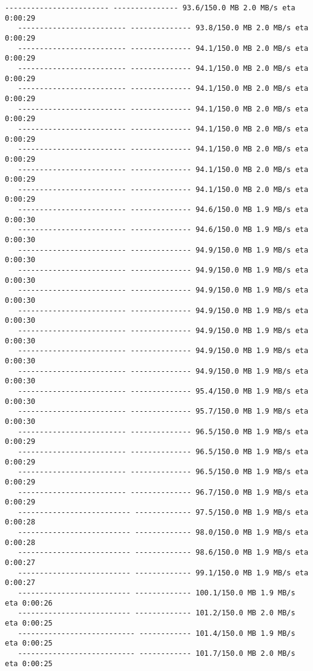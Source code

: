 \documentclass[11pt]{article}
\begin{document}
\begin{Verbatim}[commandchars=\\\{\}]
   ------------------------ --------------- 93.6/150.0 MB 2.0 MB/s eta 0:00:29
   ------------------------- -------------- 93.8/150.0 MB 2.0 MB/s eta 0:00:29
   ------------------------- -------------- 94.1/150.0 MB 2.0 MB/s eta 0:00:29
   ------------------------- -------------- 94.1/150.0 MB 2.0 MB/s eta 0:00:29
   ------------------------- -------------- 94.1/150.0 MB 2.0 MB/s eta 0:00:29
   ------------------------- -------------- 94.1/150.0 MB 2.0 MB/s eta 0:00:29
   ------------------------- -------------- 94.1/150.0 MB 2.0 MB/s eta 0:00:29
   ------------------------- -------------- 94.1/150.0 MB 2.0 MB/s eta 0:00:29
   ------------------------- -------------- 94.1/150.0 MB 2.0 MB/s eta 0:00:29
   ------------------------- -------------- 94.1/150.0 MB 2.0 MB/s eta 0:00:29
   ------------------------- -------------- 94.6/150.0 MB 1.9 MB/s eta 0:00:30
   ------------------------- -------------- 94.6/150.0 MB 1.9 MB/s eta 0:00:30
   ------------------------- -------------- 94.9/150.0 MB 1.9 MB/s eta 0:00:30
   ------------------------- -------------- 94.9/150.0 MB 1.9 MB/s eta 0:00:30
   ------------------------- -------------- 94.9/150.0 MB 1.9 MB/s eta 0:00:30
   ------------------------- -------------- 94.9/150.0 MB 1.9 MB/s eta 0:00:30
   ------------------------- -------------- 94.9/150.0 MB 1.9 MB/s eta 0:00:30
   ------------------------- -------------- 94.9/150.0 MB 1.9 MB/s eta 0:00:30
   ------------------------- -------------- 94.9/150.0 MB 1.9 MB/s eta 0:00:30
   ------------------------- -------------- 95.4/150.0 MB 1.9 MB/s eta 0:00:30
   ------------------------- -------------- 95.7/150.0 MB 1.9 MB/s eta 0:00:30
   ------------------------- -------------- 96.5/150.0 MB 1.9 MB/s eta 0:00:29
   ------------------------- -------------- 96.5/150.0 MB 1.9 MB/s eta 0:00:29
   ------------------------- -------------- 96.5/150.0 MB 1.9 MB/s eta 0:00:29
   ------------------------- -------------- 96.7/150.0 MB 1.9 MB/s eta 0:00:29
   -------------------------- ------------- 97.5/150.0 MB 1.9 MB/s eta 0:00:28
   -------------------------- ------------- 98.0/150.0 MB 1.9 MB/s eta 0:00:28
   -------------------------- ------------- 98.6/150.0 MB 1.9 MB/s eta 0:00:27
   -------------------------- ------------- 99.1/150.0 MB 1.9 MB/s eta 0:00:27
   -------------------------- ------------- 100.1/150.0 MB 1.9 MB/s eta 0:00:26
   -------------------------- ------------- 101.2/150.0 MB 2.0 MB/s eta 0:00:25
   --------------------------- ------------ 101.4/150.0 MB 1.9 MB/s eta 0:00:25
   --------------------------- ------------ 101.7/150.0 MB 2.0 MB/s eta 0:00:25

\end{Verbatim}
\end{document}
